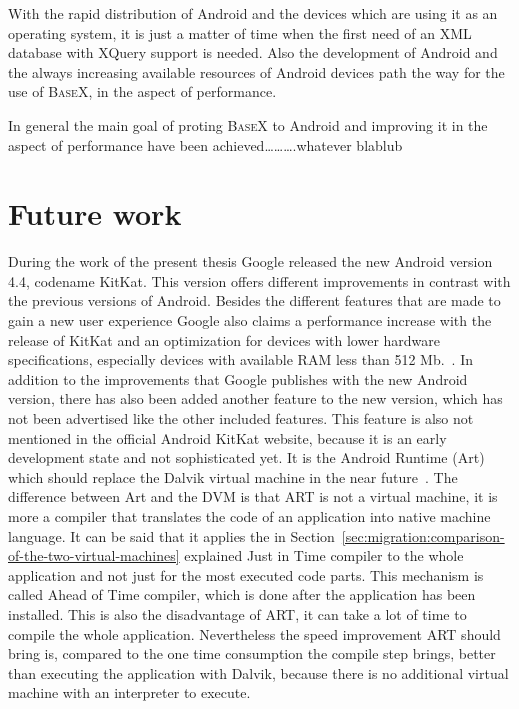 With the rapid distribution of Android and the devices which are using it as an operating system, it is just a matter of time when the first need of an XML database with XQuery support is needed.
Also the development of Android and the always increasing available resources of Android devices path the way for the use of \textsc{BaseX}, in the aspect of performance.



In general the main goal of proting \textsc{BaseX} to Android and improving it in the aspect of performance have been achieved\dots\dots\dots.whatever blablub


\section{Future work}
\label{sec:summery:future-work}
During the work of the present thesis Google released the new Android version 4.4, codename KitKat.
This version offers different improvements in contrast with the previous versions of Android.
Besides the different features that are made to gain a new user experience Google also claims a performance increase with the release of KitKat and an optimization for devices with lower hardware specifications, especially devices with available RAM less than 512 Mb.~\cite{google-kitkat}.
In addition to the improvements that Google publishes with the new Android version, there has also been added another feature to the new version, which has not been advertised like the other included features.
This feature is also not mentioned in the official Android KitKat website, because it is an early development state and not sophisticated yet.
It is the Android Runtime (Art) which should replace the Dalvik virtual machine in the near future~\cite{android-art}.
The difference between Art and the DVM is that ART is not a virtual machine, it is more a compiler that translates the code of an application into native machine language.
It can be said that it applies the in Section~\ref{sec:migration:comparison-of-the-two-virtual-machines} explained Just in Time compiler to the whole application and not just for the most executed code parts.
This mechanism is called Ahead of Time compiler, which is done after the application has been installed.
This is also the disadvantage of ART, it can take a lot of time to compile the whole application.
Nevertheless the speed improvement ART should bring is, compared to the one time consumption the compile step brings, better than executing the application with Dalvik, because there is no additional virtual machine with an interpreter to execute.
